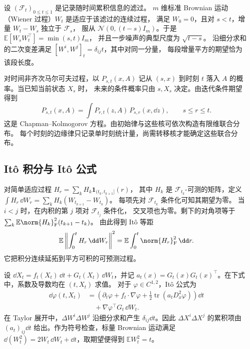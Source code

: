 设 \((\mathcal F_t)_{0\le t\le1}\) 是记录随时间累积信息的滤过。
\(m\) 维标准 Brownian 运动（Wiener 过程）\(W_t\) 是适应于该滤过的连续过程，
满足 \(W_0=0\)，且对 \(s<t\)，增量 \(W_t-W_s\) 独立于 \(\mathcal F_s\)，
服从 \(\mathcal N(0,(t-s)I_m)\)。于是
\(\mathbb E[W_sW_t^\top]=\min(s,t)I_m\)，
并且一步噪声的典型尺度为 \(\sqrt{t-s}\)。
沿细分求和的二次变差满足
\([W^i,W^j]_t=\delta_{ij}t\)，其中对同一分量，
每段增量平方的期望恰为该段长度。

对时间非齐次马尔可夫过程，以 \(P_{s,t}(x,A)\) 记从 \((s,x)\)
到时刻 \(t\) 落入 \(A\) 的概率。当已知当前状态 \(X_s\) 时，
未来的条件概率只由 \(s,X_s\) 决定。由迭代条件期望得到
\[
  P_{s,t}(x,A)=\int P_{r,t}(z,A)\,P_{s,r}(x,\dd z),
  \qquad s\le r\le t .
\]
这是 Chapman--Kolmogorov 方程。由初始律与这些核可依次构造有限维联合分布。
每个时刻的边缘律只记录单时刻统计量，尚需转移核才能确定这些联合分布。

\subsection{Itô 积分与 Itô 公式}

对简单适应过程 \(H_r=\sum_k H_k\mathbf 1_{(t_k,t_{k+1}]}(r)\)，
其中 \(H_k\) 是 \(\mathcal F_{t_k}\)-可测的矩阵，定义
\(\int H_r\,\dd W_r=\sum_k H_k(W_{t_{k+1}}-W_{t_k})\)。
每项先对 \(\mathcal F_{t_k}\) 条件化可知其期望为零。
当 \(i<j\) 时，在内积的第 \(j\) 项对 \(\mathcal F_{t_j}\) 条件化，
交叉项也为零。剩下的对角项等于
\(\sum_k\mathbb E\norm{H_k}_{\mathrm F}^2(t_{k+1}-t_k)\)。
由此得到 Itô 等距
\[
  \mathbb E\left\lVert\int_0^t H_r\,\dd W_r\right\rVert^2
    =\mathbb E\int_0^t \norm{H_r}_{\mathrm F}^2\,\dd r .
\]
它把积分连续延拓到平方可积的可预测过程。

设 \(\dd X_t=f_t(X_t)\,\dd t+G_t(X_t)\,\dd W_t\)，并记
\(a_t(x)=G_t(x)G_t(x)^\top\)。在下式中，系数及导数均在 \((t,X_t)\) 求值。
对于 \(\varphi\in C^{1,2}\)，Itô 公式为
\begin{equation}
  \begin{aligned}
    \dd\varphi(t,X_t)
     &=\left(\partial_t\varphi+f_t\cdot\nabla\varphi
         +\tfrac12\operatorname{tr}(a_t D_x^2\varphi)\right)\dd t\\
     &\quad+\nabla\varphi^\top G_t\,\dd W_t .
  \end{aligned}
  \label{eq:foundations-ito}
\end{equation}
在 Taylor 展开中，\(\Delta W^i\Delta W^j\) 沿细分求和产生
\(\delta_{ij}\dd t\)。因此 \(\Delta X^i\Delta X^j\) 的累积项由
\((a_t)_{ij}\dd t\) 给出。作为符号检查，标量 Brownian 运动满足
\(\dd(W_t^2)=2W_t\,\dd W_t+\dd t\)，取期望便得到
\(\mathbb E W_t^2=t\)。

